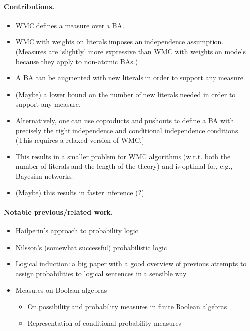 \documentclass{article}
\theoremstyle{definition}
\theoremstyle{remark}
\begin{document}
\paragraph{Contributions.}
\begin{itemize}
\item WMC defines a measure over a BA.
\item WMC with weights on literals imposes an independence assumption. (Measures
  are `slightly' more expressive than WMC with weights on models because they
  apply to non-atomic BAs.)
\item A BA can be augmented with new literals in order to support any measure.
\item (Maybe) a lower bound on the number of new literals needed in order to
  support any measure.
\item Alternatively, one can use coproducts and pushouts to define a BA with
  precisely the right independence and conditional independence conditions.
  (This requires a relaxed version of WMC.)
\item This results in a smaller problem for WMC algorithms (w.r.t. both the
  number of literals and the length of the theory) and is optimal for, e.g.,
  Bayesian networks.
\item (Maybe) this results in faster inference (?)
\end{itemize}

\paragraph{Notable previous/related work.}
\begin{itemize}
\item Hailperin's approach to probability logic
  \cite{DBLP:journals/ndjfl/Hailperin84}
\item Nilsson's (somewhat successful) probabilistic logic
  \cite{DBLP:journals/ai/Nilsson86}
\item Logical induction: a big paper with a good overview of previous attempts
  to assign probabilities to logical sentences in a sensible way
  \cite{DBLP:journals/eccc/GarrabrantBCST16}
\item Measures on Boolean algebras
  \begin{itemize}
  \item On possibility and probability measures in finite Boolean algebras
    \cite{DBLP:journals/soco/CastineiraCT02}
  \item Representation of conditional probability measures
    \cite{krauss1968representation}
  \end{itemize}
\end{itemize}
\end{document}
